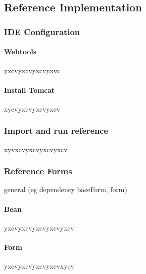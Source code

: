 \subsection{Reference Implementation}



\subsubsection{IDE Configuration}

\paragraph{Webtools}
yxcvyxcvyxcvyxvc
\paragraph{Install Tomcat}
xycvyxcvyxcvyxcv

\subsubsection{Import and run reference}
xyvxcvyxcvyxcvyxcv



\subsubsection{Reference Forms}
\label{subsec:referenceForms}
general (eg dependency baseForm, form)

\paragraph{Bean}
yxcvyxcvyxcvyxcvyxcv

\paragraph{Form}
yxcvyxcvyxcvyxcvxycv



